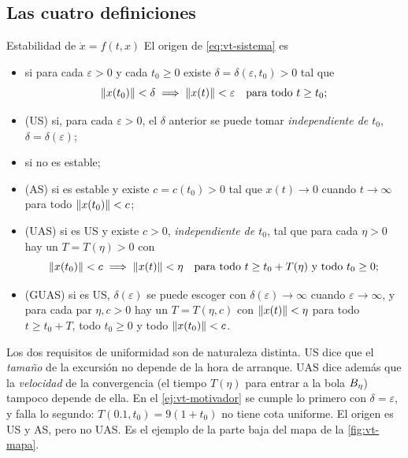 

\subsection{Las cuatro definiciones}

\begin{definicion}[label=def:vt-estabilidad]{Estabilidad de $\dot x=f(t,x)$ \citep[Def.~4.4]{Kha02}}
El origen de \eqref{eq:vt-sistema} es
\begin{itemize}
  \item {} si para cada $\varepsilon>0$ y cada $t_0\ge0$ existe $\delta=\delta(\varepsilon,t_0)>0$ tal que
  \[
    \left\lVert x(t_0)\right\rVert<\delta\;\Longrightarrow\;\left\lVert x(t)\right\rVert<\varepsilon\quad\text{para todo }t\ge t_0 ;
  \]
  \item {} (US) si, para cada $\varepsilon>0$, el $\delta$ anterior se puede tomar \emph{independiente de $t_0$}, $\delta=\delta(\varepsilon)$;
  \item {} si no es estable;
  \item {} (AS) si es estable y existe $c=c(t_0)>0$ tal que $x(t)\to0$ cuando $t\to\infty$ para todo $\left\lVert x(t_0)\right\rVert<c$;
  \item {} (UAS) si es US y existe $c>0$, \emph{independiente de $t_0$}, tal que para cada $\eta>0$ hay un $T=T(\eta)>0$ con
  \[
    \left\lVert x(t_0)\right\rVert<c\;\Longrightarrow\;\left\lVert x(t)\right\rVert<\eta\quad\text{para todo }t\ge t_0+T(\eta)\ \text{y todo }t_0\ge0 ;
  \]
  \item {} (GUAS) si es US, $\delta(\varepsilon)$ se puede escoger con $\delta(\varepsilon)\to\infty$ cuando $\varepsilon\to\infty$, y para cada par $\eta,c>0$ hay un $T=T(\eta,c)$ con $\left\lVert x(t)\right\rVert<\eta$ para todo $t\ge t_0+T$, todo $t_0\ge0$ y todo $\left\lVert x(t_0)\right\rVert<c$.
\end{itemize}
\end{definicion}

Los dos requisitos de uniformidad son de naturaleza distinta. US dice que el \emph{tamaño} de la excursión no depende de la hora de arranque. UAS dice además que la \emph{velocidad} de la convergencia (el tiempo $T(\eta)$ para entrar a la bola $B_{\eta}$) tampoco depende de ella. En el \cref{ej:vt-motivador} se cumple lo primero con $\delta=\varepsilon$, y falla lo segundo: $T(0.1,t_0)=9(1+t_0)$ no tiene cota uniforme. El origen es US y AS, pero no UAS. Es el ejemplo de la parte baja del mapa de la \cref{fig:vt-mapa}.

